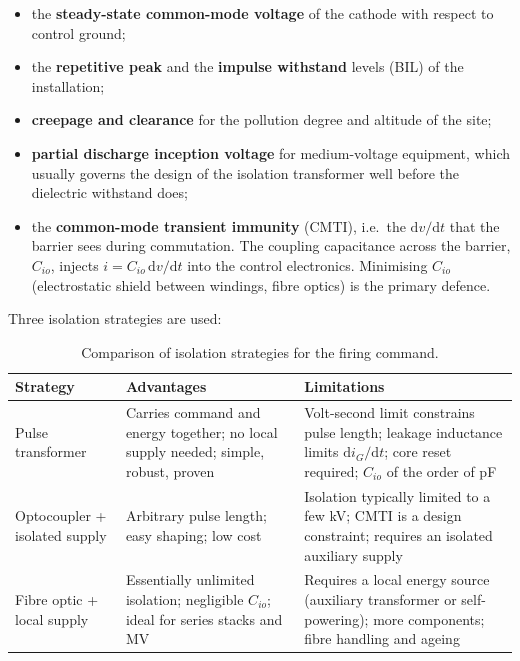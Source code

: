 \begin{itemize}
  \item the \textbf{steady-state common-mode voltage} of the cathode with respect
        to control ground;
  \item the \textbf{repetitive peak} and the \textbf{impulse withstand} levels
        (BIL) of the installation;
  \item \textbf{creepage and clearance} for the pollution degree and altitude of
        the site;
  \item \textbf{partial discharge inception voltage} for medium-voltage equipment,
        which usually governs the design of the isolation transformer well before
        the dielectric withstand does;
  \item the \textbf{common-mode transient immunity} (CMTI), i.e.\ the
        $\mathrm{d}v/\mathrm{d}t$ that the barrier sees during commutation. The
        coupling capacitance across the barrier, $C_{io}$, injects
        $i = C_{io}\,\mathrm{d}v/\mathrm{d}t$ into the control electronics.
        Minimising $C_{io}$ (electrostatic shield between windings, fibre optics)
        is the primary defence.
\end{itemize}

Three isolation strategies are used:

\begin{table}[htbp]
\centering
\caption{Comparison of isolation strategies for the firing command.}
\label{thygate:tab:iso}
\begin{tabular}{@{}p{3.1cm}p{4.6cm}p{4.6cm}@{}}
\toprule
\textbf{Strategy} & \textbf{Advantages} & \textbf{Limitations} \\
\midrule
Pulse transformer &
  Carries command and energy together; no local supply needed; simple, robust,
  proven &
  Volt-second limit constrains pulse length; leakage inductance limits
  $\mathrm{d}i_G/\mathrm{d}t$; core reset required; $C_{io}$ of the order of
  \si{\pico\farad} \\
\addlinespace
Optocoupler + isolated supply &
  Arbitrary pulse length; easy shaping; low cost &
  Isolation typically limited to a few \si{\kilo\volt}; CMTI is a design
  constraint; requires an isolated auxiliary supply \\
\addlinespace
Fibre optic + local supply &
  Essentially unlimited isolation; negligible $C_{io}$; ideal for series stacks
  and MV &
  Requires a local energy source (auxiliary transformer or self-powering);
  more components; fibre handling and ageing \\
\bottomrule
\end{tabular}
\end{table}

